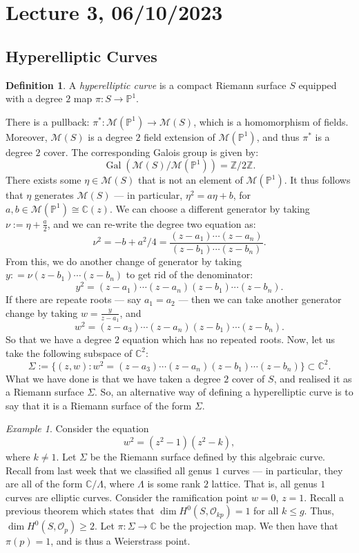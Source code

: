 \documentclass[a4paper]{report}
\theoremstyle{definition}
\newtheorem{definition}{Definition}
\theoremstyle{remark}
\theoremstyle{proposition}
\theoremstyle{conjecture}
\theoremstyle{lemma}
\theoremstyle{corollary}
\theoremstyle{exercise}
\theoremstyle{example}
\newtheorem{example}{Example}
\newcommand{\C}{\mathbb{C}}
\newcommand{\mcal}{\mathcal}
\newcommand{\on}{\operatorname}
\begin{document}
\section{Lecture 3, 06/10/2023}

\subsection{Hyperelliptic Curves}

\begin{definition}
    A \emph{hyperelliptic curve} is a compact Riemann surface $S$ 
    equipped with a degree $2$ map $\pi : S \to \mathbb{P}^1$.
\end{definition}

There is a pullback: $\pi^\ast : \mcal{M}(\mathbb{P}^1) \to \mcal{M}(S)$,
which is a homomorphism of fields. Moreover, $\mcal{M}(S)$ is a 
degree $2$ field extension of $\mcal{M}(\mathbb{P}^1)$, and thus 
$\pi^\ast$ is a degree $2$ cover. The corresponding 
Galois group is given by:
$$\on{Gal}\left(\mcal{M}(S)/\mcal{M}(\mathbb{P}^1)\right) = \mathbb{Z}/2\mathbb{Z}.$$
There exists some $\eta \in \mcal{M}(S)$ that is not an element of 
$\mcal{M}(\mathbb{P}^1)$. It thus follows that 
$\eta$ generates $\mcal{M}(S)$ --- in particular,
$\eta^2 = a\eta + b$, for $a,b\in \mcal{M}(\mathbb{P}^1) \cong \C(z)$.
We can choose a different generator by taking 
$\nu := \eta + \frac{a}{2}$, and we can re-write the degree two equation
as:
$$\nu^2 = -b + a^2/4 = \frac{(z-a_1)\cdots (z-a_n)}{(z-b_1)\cdots(z-b_n)}.$$
From this, we do another change of generator by taking 
$y : = \nu(z-b_1)\cdots(z-b_n)$ to get rid of the denominator:
$$y^2 = (z-a_1)\cdots (z-a_n)(z-b_1)\cdots (z-b_n).$$
If there are repeate roots --- say $a_1=a_2$ --- then we can take 
another generator change by taking
$w = \frac{y}{z-a_1}$, and 
$$w^2 = (z-a_3)\cdots (z-a_n) (z-b_1)\cdots(z-b_n).$$
So that we have a degree $2$ equation which has no repeated roots.
Now, let us take the following subspace of $\C^2$: 
$$\Sigma := \lbrace (z,w) : w^2 = (z-a_3)\cdots (z-a_n)(z-b_1)\cdots (z-b_n)\rbrace\subset\C^2.$$
What we have done is that we have taken a degree $2$ cover of $S$, and 
realised it as a Riemann surface $\Sigma$. So, an alternative way of defining
a hyperelliptic curve is to say that it is a Riemann surface of 
the form $\Sigma$.

\begin{example}
    Consider the equation $$w^2 = (z^2-1)(z^2-k),$$ where $k\neq 1$.
    Let $\Sigma$ be the Riemann surface defined by this algebraic curve.
    Recall from last week that we classified all genus $1$ curves ---
    in particular, they are all of the form $\C/\Lambda$, where $\Lambda$ is
    some rank $2$ lattice. That is, all genus $1$ curves are elliptic curves.
    Consider the ramification point $w=0$, $z=1$.
    Recall a previous theorem which states that $\dim H^0(S,\mcal{O}_{kp})=1$
    for all $k\leq g$. Thus, $\dim H^0(S,\mcal{O}_p)\geq 2$.
    Let $\pi : \Sigma \to \C$ be the projection map. 
    We then have that $\pi(p) = 1$, and is thus a Weierstrass point.
\end{example}
\end{document}
